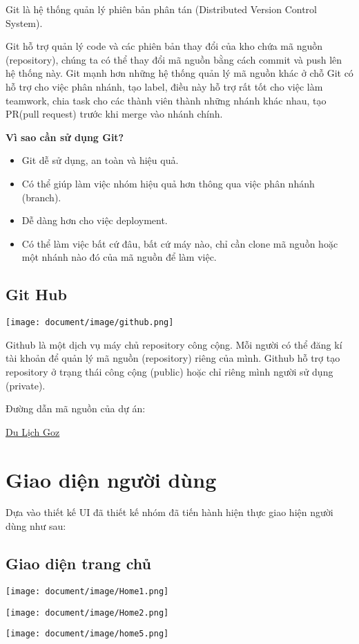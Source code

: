 Git là hệ thống quản lý phiên bản phân tán (Distributed Version Control System).\par 
Git hỗ trợ quản lý code và các phiên bản thay đổi của kho chứa mã nguồn (repository), chúng ta có thể thay đổi mã nguồn bằng cách commit và push lên hệ thống này. Git mạnh hơn những hệ thống quản lý mã nguồn khác ở chỗ Git có hỗ trợ cho việc phân nhánh, tạo label, điều này hỗ trợ rất tốt cho việc làm teamwork, chia task cho các thành viên thành những nhánh khác nhau, tạo PR(pull request) trước khi merge vào nhánh chính.\par

\textbf{Vì sao cần sử dụng Git?}
\begin{itemize}
    \item Git dễ sử dụng, an toàn và hiệu quả.
    \item Có thể giúp làm việc nhóm hiệu quả hơn thông qua việc phân nhánh (branch).
    \item Dễ dàng hơn cho việc deployment.
    \item Có thể làm việc bất cứ đâu, bất cứ máy nào, chỉ cần clone mã nguồn hoặc một nhánh nào đó của mã nguồn để làm việc.
\end{itemize}

\subsection{Git Hub}
\begin{center}
  \captionsetup{type=figure}
  \texttt{[image: document/image/github.png]}
\end{center}

Github là một dịch vụ máy chủ repository công cộng. Mỗi người có thể đăng kí tài khoản để quản lý mã nguồn (repository) riêng của mình. Github hỗ trợ tạo repository ở trạng thái công cộng (public) hoặc chỉ riêng mình người sử dụng (private).\par 
Đường dẫn mã nguồn của dự án:

\href{https://github.com/tri721305/luanvan2020}{Du Lịch Goz}
\clearpage
\section{Giao diện người dùng}
Dựa vào thiết kế UI đã thiết kế nhóm đã tiến hành hiện thực giao hiện người dùng như sau: 
\subsection{Giao diện trang chủ}
\begin{center}
  \texttt{[image: document/image/Home1.png]}
\end{center}
\begin{center}
  \texttt{[image: document/image/Home2.png]}
\end{center}
\clearpage
\begin{center}
  \captionsetup{type=figure}
  \texttt{[image: document/image/home5.png]}
\end{center}


